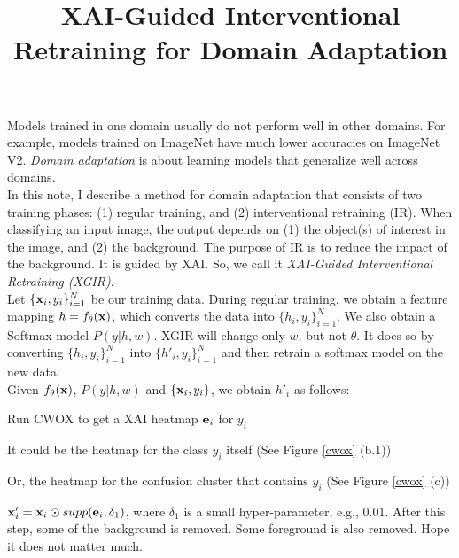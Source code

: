 \documentclass[12pt,a4paper]{article}
\begin{document}
\title{XAI-Guided Interventional Retraining for Domain Adaptation}

\date{}

\maketitle


Models trained in one domain usually do not perform well in other domains. For example, models trained on ImageNet have  much lower accuracies on ImageNet V2.  {\em Domain adaptation} is about learning models that generalize well across domains.\\


In this note, I describe a method for domain adaptation that consists of two training phases: (1) regular training, and (2) interventional retraining (IR).
When classifying an input image, the output depends on (1) the object(s) of interest in the image, and (2) the background.  The purpose of IR is to reduce the impact of the background.  It is guided by XAI. So, we call it {\em  XAI-Guided Interventional Retraining (XGIR)}.\\




Let $\{{\bf x}_i, y_i\}_{i=1}^N$ be our training data. During regular training, we obtain a feature mapping $h = f_{\theta}({\bf x})$, which converts the data into $\{h_i, y_i\}_{i=1}^N$. We also obtain a Softmax model $P(y|h, w)$.  XGIR will change only $w$, but not $\theta$. It does so by converting
$\{h_i, y_i\}_{i=1}^N$ into $\{h'_i, y_i\}_{i=1}^N$ and then retrain a softmax model  on the new data.\\


Given  $f_{\theta}({\bf x})$, $P(y|h, w)$ and  $\{{\bf x}_i, y_i\}$, we obtain $h'_i$ as follows:

\bit
\item Run CWOX to get a XAI heatmap ${\bf e}_i$ for $y_i$  
    \bit
    \item It could be the heatmap for the class $y_i$ itself  (See Figure \ref{cwox} (b.1))
    
   \item Or, the heatmap for the confusion cluster that contains $y_i$ (See Figure \ref{cwox} (c))
    \eit
\item ${\bf x}'_i = {\bf x}_i \odot supp({\bf e}_i, \delta_1)$, where $\delta_1$ is a small hyper-parameter, e.g., 0.01.  After this step, some of the background is removed. Some foreground is also removed. Hope it does not matter much.  \\
\end{document}
